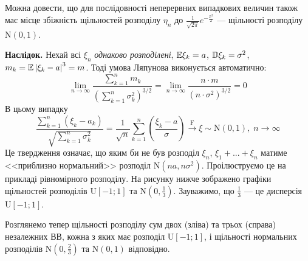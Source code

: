 \begin{remark}
    Можна довести, що для послідовності неперервних випадкових величин також має місце збіжність щільностей розподілу $\eta_n$ до $\frac{1}{\sqrt{2\pi}} e^{-\frac{x^2}{2}}$
    --- щільності розподілу $\mathrm{N}(0, 1)$.
\end{remark}
\noindent\textbf{Наслідок.} Нехай всі $\xi_n$ \emph{однаково розподілені}, $\mathbb{E}\xi_k = a$, $\mathbb{D}\xi_k = \sigma^2$,
$m_k = \mathbb{E}\left| \xi_k - a\right|^3 = m$. Тоді умова Ляпунова виконується автоматично:
$$\underset{n \rightarrow \infty}{\lim} \frac{\sum\limits_{k=1}^n m_k}{\left(
    \sum\limits_{k=1}^n \sigma_k^2
\right)^{3/2}} = \underset{n \rightarrow \infty}{\lim} \frac{n \cdot m}{(n\cdot \sigma^2)^{3/2}} = 0$$
В цьому випадку
$$\frac{\sum\limits_{k=1}^n (\xi_k - a_k)}
{\sqrt{\sum\limits_{k=1}^n \sigma_k^2}}
= \frac{1}{\sqrt{n}} \sum\limits_{k=1}^n \left( \frac{\xi_k - a}{\sigma}\right) \overset{\mathrm{F}}{\longrightarrow}\xi \sim \mathrm{N}(0, 1),
\;n \to \infty$$
Це твердження означає, що яким би не був розподіл $\xi_n$, $\xi_1 + ... + \xi_n$ матиме <<приблизно нормальний>> розподіл $\mathrm{N}(n a, n\sigma^2)$.
Проілюструємо це на прикладі рівномірного розподілу. На рисунку нижче зображено графіки щільностей розподілів
$\mathrm{U}[-1; 1]$ та $\mathrm{N}\left(0, \frac{1}{3}\right)$. Зауважимо, що $\frac{1}{3}$ --- це дисперсія $\mathrm{U}[-1; 1]$.
\begin{center}
\end{center}
Розглянемо тепер щільності розподілу сум двох (зліва) та трьох (справа) незалежних ВВ, кожна з яких має розподіл $\mathrm{U}[-1; 1]$, і щільності
нормальних розподілів $\mathrm{N}\left(0, \frac{2}{3}\right)$ та $\mathrm{N}\left(0, 1\right)$ відповідно.

